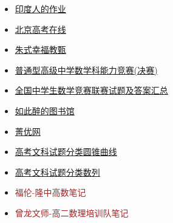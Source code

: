 \documentclass[12pt]{exam}
\begin{document}
\begin{multicols}{2}
\begin{itemize}
    \item \href{https://www.doubtnut.com/class-12/maths/determinants}{印度人的作业}
    \item \href{https://www.gaokzx.com/search?keywords=%E6%95%B0%E5%AD%A6%E8%AF%95%E9%A2%98%E5%8F%8A%E7%AD%94%E6%A1%88}{北京高考在线}
    \item \href{https://chu246.blogspot.com/search/label/%E6%95%99%E7%94%84}{朱式幸福教甄}
    \item \href{https://cantor.math.ntnu.edu.tw/workshop/110hsm/index.php?menu=Exam}{普通型高级中学数学科能力竞赛(决赛)}
    \item \href{https://www.zizzs.com/gk/jingsai/162865.html}{全国中学生数学竞赛联赛试题及答案汇总}
    \item \href{http://www.360doc.com/userhome.aspx?userid=31600819&cid=8}{如此醉的图书馆}
    \item \href{https://www.jyeoo.com/shijuan/gzsx/101/}{菁优网}
    \item \href{https://shijuan.zww.cn/gaozhong/shuxue/gaokao/1/1707.htm}{高考文科试题分类圆锥曲线}
    \item \href{https://shijuan.zww.cn/gaozhong/shuxue/gaokao/1/1709.htm}{高考文科试题分类数列}
    \item \textcolor{brown}{福伦-隆中高数笔记}
    \item \textcolor{brown}{曾龙文师-高二数理培训队笔记}
\end{itemize}
\end{multicols}
\end{document}
